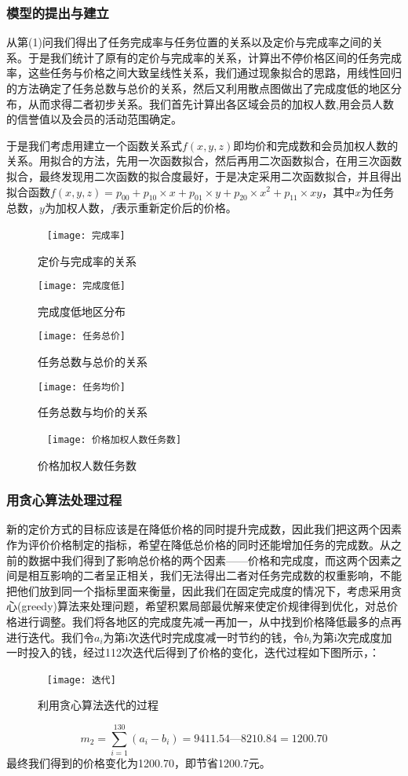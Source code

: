 \documentclass{ctexart}
\begin{document}
\subsubsection{模型的提出与建立}
从第(1)问我们得出了任务完成率与任务位置的关系以及定价与完成率之间的关系。于是我们统计了原有的定价与完成率的关系，计算出不停价格区间的任务完成率，这些任务与价格之间大致呈线性关系，我们通过现象拟合的思路，用线性回归的方法确定了任务总数与总价的关系，然后又利用散点图做出了完成度低的地区分布，从而求得二者初步关系。我们首先计算出各区域会员的加权人数,用会员人数的信誉值以及会员的活动范围确定。


于是我们考虑用建立一个函数关系式$f(x,y,z)$即均价和完成数和会员加权人数的关系。用拟合的方法，先用一次函数拟合，然后再用二次函数拟合，在用三次函数拟合，最终发现用二次函数的拟合度最好，于是决定采用二次函数拟合，并且得出拟合函数$f(x,y,z)=p_{00}+p_{10}\times x+ p_{01}\times y+p_{20}\times x^2+p_{11}\times xy$，其中$x$为任务总数，$y$为加权人数，$f$表示重新定价后的价格。
\begin{figure}[htbp]  
\centering
\texttt{[image: 完成率]} 
\caption{定价与完成率的关系}
\end{figure}
\begin{figure}[htbp] 
\centering
\texttt{[image: 完成度低]} 
\caption{完成度低地区分布}
\end{figure}
\begin{figure}[htbp] 
\centering
\texttt{[image: 任务总价]} 
\caption{任务总数与总价的关系}
\end{figure}
\begin{figure}[htbp] 
\centering
\texttt{[image: 任务均价]} 
\caption{任务总数与均价的关系}
\end{figure}
\begin{figure}[htbp]  
\centering
\texttt{[image: 价格加权人数任务数]} 
\caption{价格加权人数任务数}
\end{figure}
\newpage
\subsubsection{用贪心算法处理过程}
新的定价方式的目标应该是在降低价格的同时提升完成数，因此我们把这两个因素作为评价价格制定的指标，希望在降低总价格的同时还能增加任务的完成数。从之前的数据中我们得到了影响总价格的两个因素——价格和完成度，而这两个因素之间是相互影响的二者呈正相关，我们无法得出二者对任务完成数的权重影响，不能把他们放到同一个指标里面来衡量，因此我们在固定完成度的情况下，考虑采用贪心(greedy)算法来处理问题，希望积累局部最优解来使定价规律得到优化，对总价格进行调整。我们将各地区的完成度先减一再加一，从中找到价格降低最多的点再进行迭代。我们令$a_i$为第i次迭代时完成度减一时节约的钱，令$b_i$为第i次完成度加一时投入的钱，经过112次迭代后得到了价格的变化，迭代过程如下图所示，：
\begin{figure}[htbp]  
\centering
\texttt{[image: 迭代]} 
\caption{利用贪心算法迭代的过程}
\end{figure}
\newpage
\begin{equation}
m_2=\sum^{130}_{i=1}(a_i-b_i)=9411.54—8210.84=1200.70
\end{equation}
最终我们得到的价格变化为1200.70，即节省1200.7元。
\end{document}
